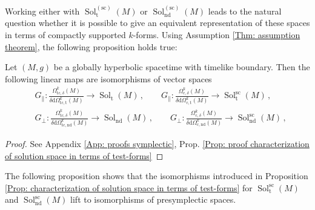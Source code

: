 Working either with $\operatorname{Sol}_{\mathrm{t}}^{(\mathrm{sc})}(M)$ or $\operatorname{Sol}_{\mathrm{nd}}^{(\mathrm{sc})}(M)$
leads to the natural question whether it is possible to give an equivalent representation of these spaces in terms of compactly supported $k$-forms.
Using Assumption \ref{Thm: assumption theorem}, the following proposition holds true:

\begin{proposition}\label{Prop: characterization of solution space in terms of test-forms}
	Let $(M,g)$ be a globally hyperbolic spacetime with timelike boundary.
	Then the following linear maps are isomorphisms of vector spaces
	\begin{align}
	&G_\parallel\colon
	\frac{\Omega_{\mathrm{tc},\delta}^k(M)}{\delta\mathrm{d}\Omega_{\mathrm{tc},\mathrm{t}}^k(M)}\to
	\operatorname{Sol}_{\mathrm{t}}(M)\,,\qquad
	G_\parallel\colon
	\frac{\Omega_{\mathrm{c},\delta}^k(M)}{\delta\mathrm{d}\Omega_{\mathrm{c},\mathrm{t}}^k(M)}\to
	\operatorname{Sol}_{\mathrm{t}}^\mathrm{sc}{}(M)\,,\\
	&G_\perp\colon
	\frac{\Omega_{\mathrm{tc},\delta}^k(M)}{\delta\mathrm{d}\Omega_{\mathrm{tc},\mathrm{nd}}^k(M)}\to
	\operatorname{Sol}_{\mathrm{nd}}(M)\,,\qquad
	G_\perp\colon
	\frac{\Omega_{\mathrm{c},\delta}^k(M)}{\delta\mathrm{d}\Omega_{\mathrm{c},\mathrm{nd}}^k(M)}\to
	\operatorname{Sol}_{\mathrm{nd}}^\mathrm{sc}{}(M)\,,
	\end{align}
\end{proposition} 
\begin{proof}
	See Appendix \ref{App: proofs symplectic}, Prop. \ref{Prop: proof characterization of solution space in terms of test-forms}
\end{proof}


The following proposition shows that the isomorphisms introduced in Proposition \ref{Prop: characterization of solution space in terms of test-forms} for $\operatorname{Sol}_{\mathrm{t}}^{\mathrm{sc}}(M)$ and $\operatorname{Sol}_{\mathrm{nd}}^{\mathrm{sc}}(M)$ lift to isomorphisms of presymplectic spaces.

